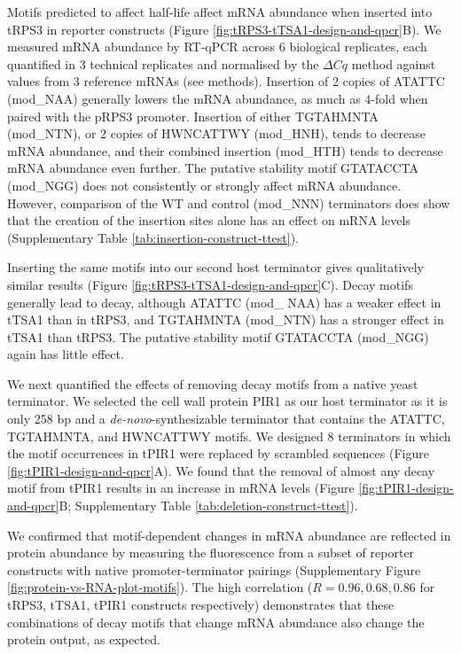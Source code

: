 \documentclass[../main.tex]{subfiles}
\begin{document}
Motifs predicted to affect half-life affect mRNA abundance when inserted into tRPS3 in reporter constructs (Figure \ref{fig:tRPS3-tTSA1-design-and-qpcr}B).
We measured mRNA abundance by RT-qPCR across 6 biological replicates, each quantified in 3 technical replicates and normalised by the \(\Delta Cq\) method against values from 3 reference mRNAs (see methods).
Insertion of 2 copies of ATATTC (mod\_NAA) generally lowers the mRNA abundance, as much as 4-fold when paired with the pRPS3 promoter.
Insertion of either TGTAHMNTA (mod\_NTN), or 2 copies of HWNCATTWY (mod\_HNH), tends to decrease mRNA abundance, and their combined insertion (mod\_HTH) tends to decrease mRNA abundance even further.
The putative stability motif GTATACCTA (mod\_NGG) does not consistently or strongly affect mRNA abundance.
However, comparison of the WT and control (mod\_NNN) terminators does show that the creation of the insertion sites alone has an effect on mRNA levels (Supplementary Table \ref{tab:insertion-construct-ttest}).

Inserting the same motifs into our second host terminator gives qualitatively similar results (Figure \ref{fig:tRPS3-tTSA1-design-and-qpcr}C).
Decay motifs generally lead to decay, although ATATTC (mod\_ NAA) has a weaker effect in tTSA1 than in tRPS3, and TGTAHMNTA (mod\_NTN) has a stronger effect in tTSA1 than tRPS3.
The putative stability motif GTATACCTA (mod\_NGG) again has little effect.

We next quantified the effects of removing decay motifs from a native yeast terminator.
We selected the cell wall protein PIR1 as our host terminator as it is only 258 bp \parencite{Pelechano2013} and a \emph{de-novo}-synthesizable terminator that contains the ATATTC, TGTAHMNTA, and HWNCATTWY motifs.
We designed 8 terminators in which the motif occurrences in tPIR1 were replaced by scrambled sequences (Figure \ref{fig:tPIR1-design-and-qpcr}A).
We found that the removal of almost any decay motif from tPIR1 results in an increase in mRNA levels (Figure \ref{fig:tPIR1-design-and-qpcr}B; Supplementary Table \ref{tab:deletion-construct-ttest}).

We confirmed that motif-dependent changes in mRNA abundance are reflected in protein abundance by measuring the fluorescence from a subset of reporter constructs with native promoter-terminator pairings (Supplementary Figure \ref{fig:protein-vs-RNA-plot-motifs}).
The high correlation (\(R = 0.96, 0.68, 0.86\) for tRPS3, tTSA1, tPIR1 constructs respectively) demonstrates that these combinations of decay motifs that change mRNA abundance also change the protein output, as expected.
\end{document}

